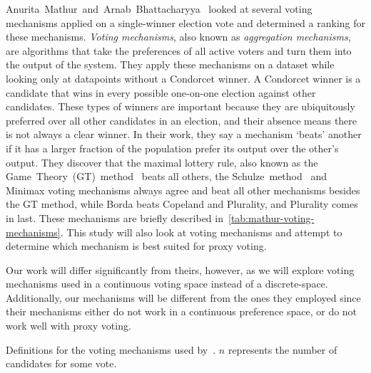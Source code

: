 Anurita~Mathur~and~Arnab~Bhattacharyya~\cite{Mathur2017} looked at several voting
mechanisms applied on a single-winner election vote and determined a ranking for
these mechanisms.
\textit{Voting mechanisms}, also known as \textit{aggregation mechanisms}, are
algorithms that take the preferences of all active voters and turn them into the
output of the system.
They apply these mechanisms on a dataset while looking only at datapoints without a
Condorcet winner.
A Condorcet winner is a candidate that wins in every possible one-on-one election
against other candidates.
These types of winners are important because they are ubiquitously preferred over
all other candidates in an election, and their absence means there is not always a
clear winner.
In their work, they say a mechanism `beats' another if it has a larger fraction of
the population prefer its output over the other's output.
They discover that the maximal lottery rule, also known as the
Game~Theory~(GT)~method~\cite{Rivest2010} beats all others, the
Schulze~method~\cite{Schulze2011} and Minimax voting mechanisms always agree and beat
all other mechanisms besides the GT method, while Borda beats Copeland and Plurality,
and Plurality comes in last.
These mechanisms are briefly described in~\autoref{tab:mathur-voting-mechanisms}.
This study will also look at voting mechanisms and attempt to determine which
mechanism is best suited for proxy voting.

Our work will differ significantly from theirs, however, as we will explore voting
mechanisms used in a continuous voting space instead of a discrete-space.
Additionally, our mechanisms will be different from the ones they employed since
their mechanisms either do not work in a continuous preference space, or do not work
well with proxy voting.

\begin{table}[htbp]
    \renewcommand{\arraystretch}{1.3}

    \caption{
        Definitions for the voting mechanisms used by~\cite{Mathur2017}.
        $n$ represents the number of candidates for some vote.
    }
    \label{tab:mathur-voting-mechanisms}

    \centering
    
\end{table}
%



